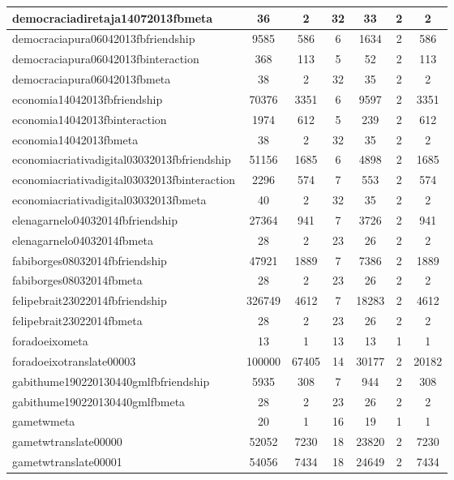 \begin{table*}[h!]
\begin{center}
\begin{tabular}{| l | c | c | c | c | c | c |}
democraciadiretaja14072013fbmeta & 36  & 2  & 32  & 33  & 2  & 2 \\\hline
democraciapura06042013fbfriendship & 9585  & 586  & 6  & 1634  & 2  & 586 \\\hline
democraciapura06042013fbinteraction & 368  & 113  & 5  & 52  & 2  & 113 \\\hline
democraciapura06042013fbmeta & 38  & 2  & 32  & 35  & 2  & 2 \\\hline
economia14042013fbfriendship & 70376  & 3351  & 6  & 9597  & 2  & 3351 \\\hline
economia14042013fbinteraction & 1974  & 612  & 5  & 239  & 2  & 612 \\\hline
economia14042013fbmeta & 38  & 2  & 32  & 35  & 2  & 2 \\\hline
economiacriativadigital03032013fbfriendship & 51156  & 1685  & 6  & 4898  & 2  & 1685 \\\hline
economiacriativadigital03032013fbinteraction & 2296  & 574  & 7  & 553  & 2  & 574 \\\hline
economiacriativadigital03032013fbmeta & 40  & 2  & 32  & 35  & 2  & 2 \\\hline
elenagarnelo04032014fbfriendship & 27364  & 941  & 7  & 3726  & 2  & 941 \\\hline
elenagarnelo04032014fbmeta & 28  & 2  & 23  & 26  & 2  & 2 \\\hline
fabiborges08032014fbfriendship & 47921  & 1889  & 7  & 7386  & 2  & 1889 \\\hline
fabiborges08032014fbmeta & 28  & 2  & 23  & 26  & 2  & 2 \\\hline
felipebrait23022014fbfriendship & 326749  & 4612  & 7  & 18283  & 2  & 4612 \\\hline
felipebrait23022014fbmeta & 28  & 2  & 23  & 26  & 2  & 2 \\\hline
foradoeixometa & 13  & 1  & 13  & 13  & 1  & 1 \\\hline
foradoeixotranslate00003 & 100000  & 67405  & 14  & 30177  & 2  & 20182 \\\hline
gabithume190220130440gmlfbfriendship & 5935  & 308  & 7  & 944  & 2  & 308 \\\hline
gabithume190220130440gmlfbmeta & 28  & 2  & 23  & 26  & 2  & 2 \\\hline
gametwmeta & 20  & 1  & 16  & 19  & 1  & 1 \\\hline
gametwtranslate00000 & 52052  & 7230  & 18  & 23820  & 2  & 7230 \\\hline
gametwtranslate00001 & 54056  & 7434  & 18  & 24649  & 2  & 7434 \\\hline

\end{tabular}
\end{center}
\end{table*}
